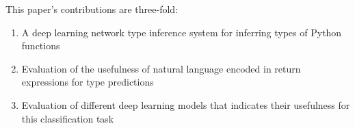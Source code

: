 This paper's contributions are three-fold:
\begin{enumerate}
    \item A deep learning network type inference system for inferring types of Python functions
    \item Evaluation of the usefulness of natural language encoded in return expressions for type predictions
    \item Evaluation of different deep learning models that indicates their usefulness for this classification task
\end{enumerate}

